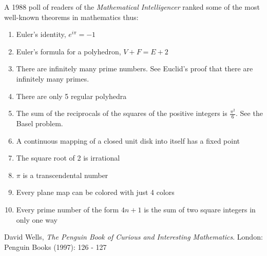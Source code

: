 \documentclass[12pt]{article}
\begin{document}
A 1988 poll of readers of the {\it Mathematical Intelligencer} ranked some of the most well-known theorems in mathematics thus:

\begin{enumerate}
\item Euler's identity, $e^{i \pi} = -1$
\item Euler's formula for a polyhedron, $V + F = E + 2$
\item There are infinitely many prime numbers. See Euclid's proof that there are infinitely many primes.
\item There are only 5 regular polyhedra
\item The sum of the reciprocals of the squares of the positive integers is $\frac{\pi^2}{6}$. See the Basel problem.
\item A continuous mapping of a closed unit disk into itself has a fixed point
\item The square root of 2 is irrational
\item $\pi$ is a transcendental number
\item Every plane map can be colored with just 4 colors
\item Every prime number of the form $4n + 1$ is the sum of two square integers in only one way
\end{enumerate}

\begin{thebibliography}{1}
 David Wells, {\it The Penguin Book of Curious and Interesting Mathematics}. London: Penguin Books (1997): 126 - 127
\end{thebibliography}
\end{document}
